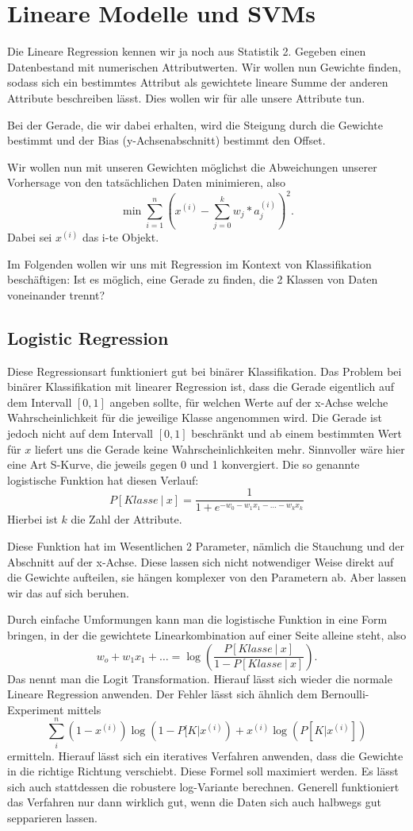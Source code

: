 \section{Lineare Modelle und SVMs}
Die Lineare Regression kennen wir ja noch aus Statistik 2.
Gegeben einen Datenbestand mit numerischen Attributwerten.
Wir wollen nun Gewichte finden, sodass sich ein bestimmtes Attribut
als gewichtete lineare Summe der anderen Attribute beschreiben lässt.
Dies wollen wir für alle unsere Attribute tun.

Bei der Gerade, die wir dabei erhalten, wird die Steigung durch
die Gewichte bestimmt und der Bias (y-Achsenabschnitt) bestimmt
den Offset.  

Wir wollen nun mit unseren Gewichten möglichst die Abweichungen
unserer Vorhersage von den tatsächlichen Daten minimieren, also
\[ \min \sum_{i=1}^{n}\left( x^{(i)} - 
\sum_{j=0}^k w_j * a_j^{(i)}\right)^2 .\]
Dabei sei \(x^{(i)}\) das i-te Objekt.

Im Folgenden wollen wir uns mit Regression im Kontext von
Klassifikation beschäftigen: Ist es möglich, eine Gerade zu finden,
die 2 Klassen von Daten voneinander trennt?

\subsection{Logistic Regression}
Diese Regressionsart funktioniert gut bei binärer Klassifikation.
Das Problem bei binärer Klassifikation mit linearer Regression ist,
dass die Gerade eigentlich auf dem Intervall \([0,1]\) angeben sollte,
für welchen Werte auf der x-Achse welche Wahrscheinlichkeit für
die jeweilige Klasse angenommen wird. Die Gerade ist jedoch nicht auf
dem Intervall \([0,1]\) beschränkt und ab einem bestimmten Wert
für \(x\) liefert uns die Gerade keine Wahrscheinlichkeiten mehr.
Sinnvoller wäre hier eine Art S-Kurve, die jeweils gegen 0 und 1 konvergiert.
Die so genannte logistische Funktion hat diesen Verlauf:
\[P[Klasse\ |\ x]= \frac{1}{1+e^{-w_0 - w_1 x_1 - \dots - w_k x_k}}\]
Hierbei ist \(k\) die Zahl der Attribute.

Diese Funktion hat im Wesentlichen 2 Parameter, nämlich die Stauchung
und der Abschnitt auf der x-Achse. Diese lassen sich nicht notwendiger
Weise direkt auf die Gewichte aufteilen, sie hängen komplexer von 
den Parametern ab. Aber lassen wir das auf sich beruhen.

Durch einfache Umformungen kann man die logistische Funktion in eine
Form bringen, in der  die gewichtete Linearkombination auf einer Seite
alleine steht, also 
\[w_o + w_1 x_1 + \dots = \log \left(
\frac{P[Klasse\ |\ x]}{1 - P[Klasse\ |\ x]}\right).\]
Das nennt man die Logit Transformation. Hierauf lässt sich wieder die
normale Lineare Regression anwenden. Der Fehler lässt sich ähnlich
dem Bernoulli-Experiment mittels
\[\sum_i^n (1-x^{(i)})\log(1-P[K|x^{(i)}) + 
x^{(i)}\log(P[K|x^{(i)}])\]
ermitteln. Hierauf lässt sich ein iteratives Verfahren anwenden, dass die Gewichte
in die richtige Richtung verschiebt. Diese Formel soll maximiert werden.
Es lässt sich auch stattdessen die robustere log-Variante berechnen. 
Generell funktioniert das Verfahren nur dann wirklich gut, wenn die 
Daten sich auch halbwegs gut sepparieren lassen.

